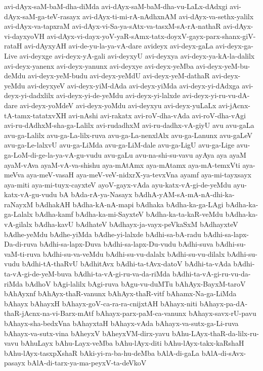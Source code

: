 {avi-dAyx-saM-baM-dha-diMda
avi-dAyx-saM-baM-dha-vu-LaLx-dAdxgi
avi-dAyx-saM-ga-teV-rasayx
avi-dAyx-ti-mi-rA-nAdhxnAM
avi-dAyx-va-sethx-yalilx
avi-dAyx-va-tapxraM
avi-dAyx-vi-Sa-ya-sAtx-va-tasxM-sA-rA-nathaR
avi-dAyx-vi-dayxyoVH
avi-dAyx-vi-dayx-yoV-yaR-sAmx-tatx-doyxV-gayx-parx-shanx-giV-rataH
avi-dAyxyAH
avi-de-yu-la-ya-vA-dare
avideyx
avi-deyx-gaLa
avi-deyx-ga-Live
avi-deyxge
avi-deyx-yA-gali
avi-deyxyU
avi-deyxya
avi-deyx-ya-kA-la-dalilx
avi-deyx-yanenx
avi-deyx-yanunx
avi-deyxye
avi-deyx-yeMba
avi-deyx-yeM-bu-deMdu
avi-deyx-yeM-budu
avi-deyx-yeMdU
avi-deyx-yeM-dathaR
avi-deyx-yeMdu
avi-deyxyeV
avi-deyx-yiM-dAda
avi-deyx-yiMda
avi-deyx-yi-dAdxga
avi-deyx-yi-dadxlilx
avi-deyx-yi-de-yeMdu
avi-deyx-yi-lalxde
avi-deyx-yi-ru-vu-dA-dare
avi-deyx-yoMdeV
avi-deyx-yoMdu
avi-deyxyu
avi-deyx-yuLaLx
avi-jAcnx-tA-tamx-tatatxvXH
avi-nAshi
avi-rakatx
avi-roV-dha-vAda
avi-roV-dha-vAgi
avi-ru-dAdhxM-sha-ga-Lalilx
avi-rudadhxM
avi-ru-dadhx-vA-giyU
avu
avu-gaLa
avu-ga-Lalilx
avu-ga-La-lilx-ruva
avu-ga-La-nenxlAlx
avu-ga-Lanunx
avu-gaLeV
avu-ga-Le-lalxvU
avu-ga-LiMda
avu-ga-LiM-dale
avu-ga-LigU
avu-ga-Lige
avu-ga-LoM-di-ge-la-ya-vA-gu-vudu
avu-gaLu
avu-na-shi-su-vavu
ayAya
aya
ayaM
ayaM-vAva
ayaM-vA-va-shishu
aya-mAtAmx
aya-mAtamx
aya-mA-temxVti
aya-meVva
aya-meV-vasaH
aya-meV-veV-nidxrX-ya-tevxVna
ayamf
aya-mi-tayxsayx
aya-miti
aya-mi-tuyx-cayxteV
ayoV-gayx-vAda
ayu-katx-vA-gi-de-yeMdu
ayu-katx-vA-gu-vudu
bA
bAda-rA-ya-Nasayx
bAdhA-yAM-sA-mA-nA-dhi-ka-raNayxM
bAdhakAH
bAdha-kA-nA-mapi
bAdhaka
bAdha-ka-ga-LAgi
bAdha-ka-ga-Lalalx
bAdha-kamf
bAdha-ka-mi-SayxteV
bAdha-ka-ta-kaR-veMdu
bAdha-ka-vA-gilalx
bAdha-kavU
bAdhateV
bAdhayx-ja-vayx-peVkaSxM
bAdhayxteV
bAdhe-yeMdu
bAdhe-yiMda
bAdhe-yi-lalxde
bAdhi-sa-bA-radu
bAdhi-sa-lapx-Da-di-ruva
bAdhi-sa-lapx-Duva
bAdhi-sa-lapx-Du-vudu
bAdhi-suva
bAdhi-su-vaM-ti-ruva
bAdhi-su-va-veMdu
bAdhi-su-vu-dalalx
bAdhi-su-vu-dilalx
bAdhi-su-vudu
bAdhi-tA-thaRvU
bAdhitAvx
bAdhi-ta-tAvx-datoV
bAdhi-ta-vAda
bAdhi-ta-vA-gi-de-yeM-buva
bAdhi-ta-vA-gi-ru-va-da-riMda
bAdhi-ta-vA-gi-ru-vu-da-riMda
bAdhoV
bAgi-lalilx
bAgi-ruva
bAgu-vu-duMTu
bAhAyx-BayxM-taroV
bAhAyxnf
bAhAyx-thaR-vanunx
bAhAyx-thaR-vitf
bAhamx-Na-ga-LiMda
bAhayx
bAhayxH
bAhayx-goV-ca-ra-ra-cnijxtAH
bAhayx-niti
bAhayx-pa-dA-thaR-jAcnx-na-vi-Barx-mAtf
bAhayx-parx-paM-ca-vanunx
bAhayx-savx-rU-pavu
bAhayx-sha-bedxVna
bAhayxtaH
bAhayx-vAda
bAhayx-va-sutx-ga-Li-ruva
bAhayx-va-sutx-vina
bAheyxV
bAheyxVM-dirx-yavu
bAhu-LAyx-thaR-da-lilx-ru-vavu
bAhuLayx
bAhu-Layx-veMba
bAhu-lAyx-diti
bAhu-lAyx-takx-kaRshaH
bAhu-lAyx-tasxpXshaR
bAki-yi-ra-ba-hu-deMba
bAlA-di-gaLa
bAlA-di-sAvx-pasayx
bAlA-di-tarx-ya-ma-peyxV-ta-deVkoV
}
